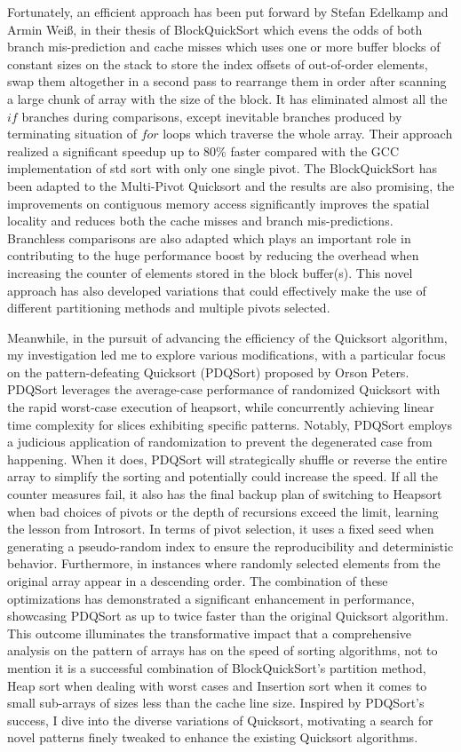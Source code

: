 \documentclass{article}
\begin{document}
Fortunately, an efficient approach has been put forward by Stefan Edelkamp and Armin Weiß,
in their thesis of BlockQuickSort \cite{BlockQuickSort}
which evens the odds of both branch mis-prediction and cache misses which uses one or more buffer blocks of constant sizes on the stack
to store the index offsets of out-of-order elements, swap them altogether in a second pass to rearrange them in order
after scanning a large chunk of array with the size of the block.
It has eliminated almost all the $if$ branches during comparisons, except inevitable branches produced by terminating situation of $for$ loops which traverse the whole array.
Their approach realized a significant speedup up to 80\% faster compared with the GCC implementation of std sort
with only one single pivot. The BlockQuickSort has been adapted to the Multi-Pivot Quicksort and the results are also promising,
the improvements on contiguous memory access significantly improves the spatial locality and reduces both the cache misses and branch mis-predictions.
Branchless comparisons are also adapted which plays an important role in contributing to the huge performance boost by reducing the overhead
when increasing the counter of elements stored in the block buffer(s).
This novel approach has also developed variations that could effectively make the use of different partitioning methods and multiple pivots selected. 

Meanwhile, in the pursuit of advancing the efficiency of the Quicksort algorithm,
my investigation led me to explore various modifications, 
with a particular focus on the pattern-defeating Quicksort (PDQSort) proposed by Orson Peters. 
PDQSort leverages the average-case performance of randomized Quicksort with the rapid worst-case execution of heapsort, 
while concurrently achieving linear time complexity for slices exhibiting specific patterns. 
Notably, PDQSort employs a judicious application of randomization to prevent the degenerated case from happening.
When it does, PDQSort will strategically shuffle or reverse the entire array to simplify the sorting and potentially could increase the speed.
If all the counter measures fail, it also has the final backup plan of switching to Heapsort when bad choices of pivots or the depth of recursions exceed the limit,
learning the lesson from Introsort. 
In terms of pivot selection, it uses a fixed seed when generating a pseudo-random index to ensure the reproducibility and deterministic behavior.
Furthermore, in instances where randomly selected elements from the original array appear in a descending order.
The combination of these optimizations has demonstrated a significant enhancement in performance, showcasing PDQSort as up to twice faster than the original Quicksort algorithm. 
This outcome illuminates the transformative impact that a comprehensive analysis on the pattern of arrays has on the speed of sorting algorithms,
not to mention it is a successful combination of BlockQuickSort's partition method,
Heap sort when dealing with worst cases and Insertion sort when it comes to small sub-arrays of sizes less than the cache line size. 
Inspired by PDQSort's success, I dive into the diverse variations of Quicksort,
motivating a search for novel patterns finely tweaked to enhance the existing Quicksort algorithms.
\end{document}
